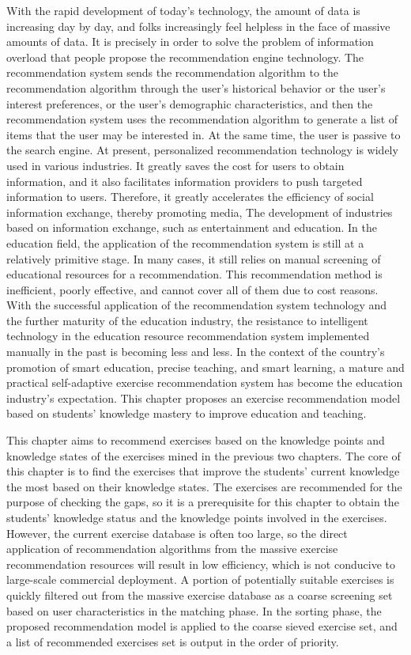 With the rapid development of today's technology, the amount of data is increasing day by day, and folks increasingly feel helpless in the face of massive amounts of data. It is precisely in order to solve the problem of information overload that people propose the recommendation engine technology. The recommendation system sends the recommendation algorithm to the recommendation algorithm through the user's historical behavior or the user's interest preferences, or the user's demographic characteristics, and then the recommendation system uses the recommendation algorithm to generate a list of items that the user may be interested in. At the same time, the user is passive to the search engine. At present, personalized recommendation technology is widely used in various industries. It greatly saves the cost for users to obtain information, and it also facilitates information providers to push targeted information to users. Therefore, it greatly accelerates the efficiency of social information exchange, thereby promoting media, The development of industries based on information exchange, such as entertainment and education. In the education field, the application of the recommendation system is still at a relatively primitive stage. In many cases, it still relies on manual screening of educational resources for a recommendation. This recommendation method is inefficient, poorly effective, and cannot cover all of them due to cost reasons. With the successful application of the recommendation system technology and the further maturity of the education industry, the resistance to intelligent technology in the education resource recommendation system implemented manually in the past is becoming less and less. In the context of the country's promotion of smart education, precise teaching, and smart learning, a mature and practical self-adaptive exercise recommendation system has become the education industry's expectation. This chapter proposes an exercise recommendation model based on students' knowledge mastery to improve education and teaching.

This chapter aims to recommend exercises based on the knowledge points and knowledge states of the exercises mined in the previous two chapters. The core of this chapter is to find the exercises that improve the students' current knowledge the most based on their knowledge states. The exercises are recommended for the purpose of checking the gaps, so it is a prerequisite for this chapter to obtain the students' knowledge status and the knowledge points involved in the exercises.  However, the current exercise database is often too large, so the direct application of recommendation algorithms from the massive exercise recommendation resources will result in low efficiency, which is not conducive to large-scale commercial deployment. A portion of potentially suitable exercises is quickly filtered out from the massive exercise database as a coarse screening set based on user characteristics in the matching phase. In the sorting phase, the proposed recommendation model is applied to the coarse sieved exercise set, and a list of recommended exercises set is output in the order of priority.

